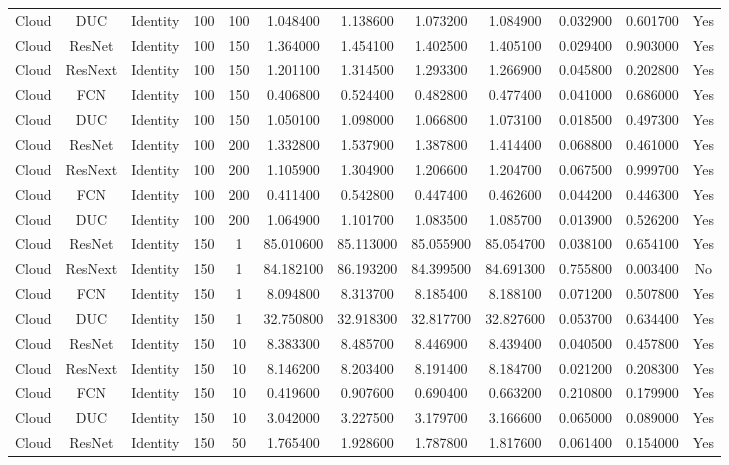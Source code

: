 \begin{tabular}{|c||c||c||c||c||c||c||c||c||c||c||c|}
Cloud & DUC & Identity & 100 & 100 & 1.048400 & 1.138600 & 1.073200 & 1.084900 & 0.032900 & 0.601700 & Yes \\
Cloud & ResNet & Identity & 100 & 150 & 1.364000 & 1.454100 & 1.402500 & 1.405100 & 0.029400 & 0.903000 & Yes \\
Cloud & ResNext & Identity & 100 & 150 & 1.201100 & 1.314500 & 1.293300 & 1.266900 & 0.045800 & 0.202800 & Yes \\
Cloud & FCN & Identity & 100 & 150 & 0.406800 & 0.524400 & 0.482800 & 0.477400 & 0.041000 & 0.686000 & Yes \\
Cloud & DUC & Identity & 100 & 150 & 1.050100 & 1.098000 & 1.066800 & 1.073100 & 0.018500 & 0.497300 & Yes \\
Cloud & ResNet & Identity & 100 & 200 & 1.332800 & 1.537900 & 1.387800 & 1.414400 & 0.068800 & 0.461000 & Yes \\
Cloud & ResNext & Identity & 100 & 200 & 1.105900 & 1.304900 & 1.206600 & 1.204700 & 0.067500 & 0.999700 & Yes \\
Cloud & FCN & Identity & 100 & 200 & 0.411400 & 0.542800 & 0.447400 & 0.462600 & 0.044200 & 0.446300 & Yes \\
Cloud & DUC & Identity & 100 & 200 & 1.064900 & 1.101700 & 1.083500 & 1.085700 & 0.013900 & 0.526200 & Yes \\
Cloud & ResNet & Identity & 150 & 1 & 85.010600 & 85.113000 & 85.055900 & 85.054700 & 0.038100 & 0.654100 & Yes \\
Cloud & ResNext & Identity & 150 & 1 & 84.182100 & 86.193200 & 84.399500 & 84.691300 & 0.755800 & 0.003400 & No \\
Cloud & FCN & Identity & 150 & 1 & 8.094800 & 8.313700 & 8.185400 & 8.188100 & 0.071200 & 0.507800 & Yes \\
Cloud & DUC & Identity & 150 & 1 & 32.750800 & 32.918300 & 32.817700 & 32.827600 & 0.053700 & 0.634400 & Yes \\
Cloud & ResNet & Identity & 150 & 10 & 8.383300 & 8.485700 & 8.446900 & 8.439400 & 0.040500 & 0.457800 & Yes \\
Cloud & ResNext & Identity & 150 & 10 & 8.146200 & 8.203400 & 8.191400 & 8.184700 & 0.021200 & 0.208300 & Yes \\
Cloud & FCN & Identity & 150 & 10 & 0.419600 & 0.907600 & 0.690400 & 0.663200 & 0.210800 & 0.179900 & Yes \\
Cloud & DUC & Identity & 150 & 10 & 3.042000 & 3.227500 & 3.179700 & 3.166600 & 0.065000 & 0.089000 & Yes \\
Cloud & ResNet & Identity & 150 & 50 & 1.765400 & 1.928600 & 1.787800 & 1.817600 & 0.061400 & 0.154000 & Yes \\

\end{tabular}
